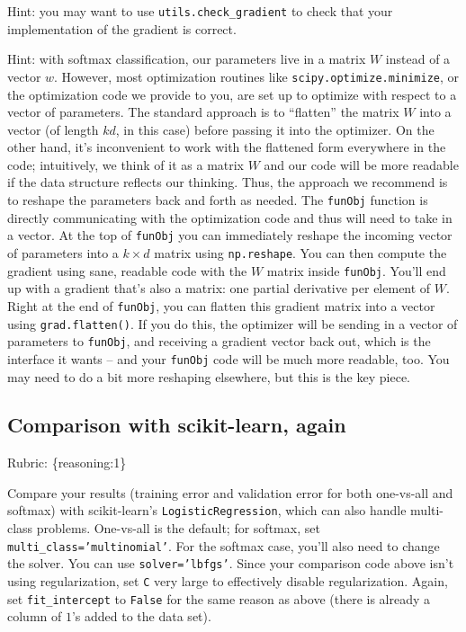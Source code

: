 \documentclass{article}
\def\rubric#1{\gre{Rubric: \{#1\}}}{}
\def\gre#1{{\color{gre}#1}}
\begin{document}
Hint: you may want to use \verb|utils.check_gradient| to check that your implementation of the gradient is correct.

Hint: with softmax classification, our parameters live in a matrix $W$ instead of a vector $w$. However, most optimization routines like \texttt{scipy.optimize.minimize}, or the optimization code we provide to you, are set up to optimize with respect to a vector of parameters. The standard approach is to ``flatten'' the matrix $W$ into a vector (of length $kd$, in this case) before passing it into the optimizer. On the other hand, it's inconvenient to work with the flattened form everywhere in the code; intuitively, we think of it as a matrix $W$ and our code will be more readable if the data structure reflects our thinking. Thus, the approach we recommend is to reshape the parameters back and forth as needed. The \texttt{funObj} function is directly communicating with the optimization code and thus will need to take in a vector. At the top of \texttt{funObj} you can immediately reshape the incoming vector of parameters into a $k \times d$ matrix using \texttt{np.reshape}. You can then compute the gradient using sane, readable code with the $W$ matrix inside \texttt{funObj}. You'll end up with a gradient that's also a matrix: one partial derivative per element of $W$. Right at the end of \texttt{funObj}, you can flatten this gradient matrix into a vector using \texttt{grad.flatten()}. If you do this, the optimizer will be sending in a vector of parameters to \texttt{funObj}, and receiving a gradient vector back out, which is the interface it wants -- and your \texttt{funObj} code will be much more readable, too. You may need to do a bit more reshaping elsewhere, but this is the key piece.

\subsection{Comparison with scikit-learn, again}
\rubric{reasoning:1}

Compare your results (training error and validation error for both one-vs-all and softmax) with scikit-learn's \texttt{LogisticRegression},
which can also handle multi-class problems.
One-vs-all is the default; for softmax, set \texttt{multi\string_class='multinomial'}. For the softmax case,
you'll also need to change the solver. You can use \texttt{solver='lbfgs'}.
Since your comparison code above isn't using regularization, set \texttt{C} very large to effectively disable regularization.
Again, set \texttt{fit\string_intercept} to \texttt{False} for the same reason as above (there is already a column of $1$'s added to the data set).
\end{document}
